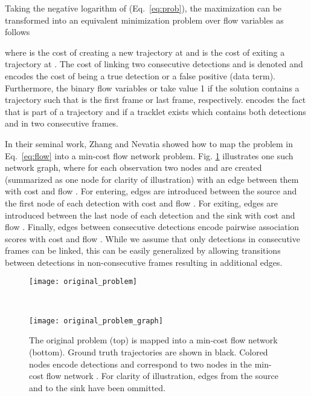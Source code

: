 \documentclass[10pt,twocolumn,letterpaper]{article}
\renewcommand{\eqref}[1]{Eq.~\ref{#1}}
\begin{document}
Taking the negative logarithm of (\eqref{eq:prob}), the maximization can be transformed into an equivalent minimization problem over flow variables \cite{Zhang2008CVPR} as follows 
 
where  is the cost of creating a new trajectory at  and   is the cost of exiting a trajectory at . The cost of linking two consecutive  detections  and  is denoted  and  encodes the cost of   being a true detection or a false positive (data term). 
Furthermore, the binary flow variables  or  take value 1 if the solution contains a trajectory such that  is the first frame or last frame, respectively.  encodes the fact that  is part of a trajectory and  if a tracklet exists which contains both detections  and  in two consecutive frames. 

In their seminal work, Zhang and Nevatia \cite{Zhang2008CVPR}  showed how to map the problem in \eqref{eq:flow} into a min-cost flow network problem. Fig. \ref{fig:problem_mapping} illustrates one such network graph, where for each observation two nodes  and  are created (summarized as one node for clarity of illustration) with an edge between them with cost  and flow .
For entering, edges are introduced between the source  and the first node of each detection with cost  and flow .
For exiting, edges are introduced  between the last node of each detection and the sink with cost  and flow .
Finally, edges between consecutive detections  encode pairwise association scores with cost  and flow . 
While we assume that only detections in consecutive frames can be linked, this can be easily generalized by allowing transitions between detections in non-consecutive frames resulting in additional edges.
 
\begin{figure}[t!]
  \centering
  \begin{minipage}[b]{0.9\linewidth}
    \texttt{[image: original\_problem]}
  \end{minipage}\\
\vspace{0.2cm}
  \begin{minipage}[b]{0.9\linewidth}
    \texttt{[image: original\_problem\_graph]}
  \end{minipage}
  \caption{The original problem (top) is mapped into a min-cost flow network (bottom). Ground truth trajectories are shown in black. Colored nodes encode detections and correspond to two nodes in the min-cost flow network . For clarity of illustration, edges from the source and to the sink have been ommitted.}
  \label{fig:problem_mapping}
\vspace{0.3cm}
\end{figure}
\end{document}
